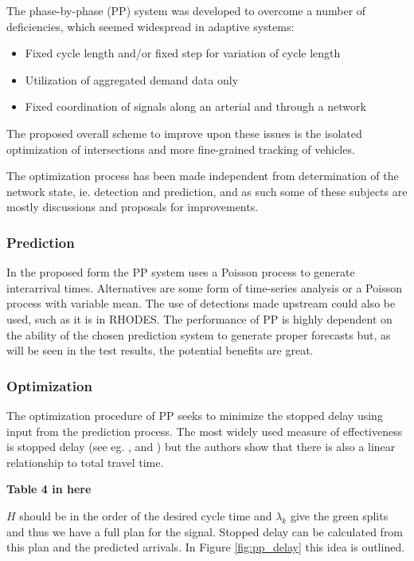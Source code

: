The phase-by-phase (PP) system was developed to overcome a number of
deficiencies, which seemed widespread in adaptive systems:

\begin{itemize}
\item Fixed cycle length and/or fixed step for variation of cycle length
\item Utilization of aggregated demand data only
\item Fixed coordination of signals along an arterial and through a network
\end{itemize}

The proposed overall scheme to improve upon these issues is the
isolated optimization of intersections and more fine-grained tracking
of vehicles.

The optimization process has been made independent from determination
of the network state, ie. detection and prediction, and as such some of
these subjects are mostly discussions and proposals for improvements.

\subsubsection*{Prediction}

In the proposed form the PP system uses a Poisson process to generate
interarrival times.  Alternatives are some form of time-series
analysis or a Poisson process with variable mean. The use of
detections made upstream could also be used, such as it is in RHODES.
The performance of PP is highly dependent on the ability of the chosen
prediction system to generate proper forecasts but, as will be seen in
the test results, the potential benefits are great.

\subsubsection*{Optimization}

The optimization procedure of PP seeks to minimize the stopped delay
using input from the prediction process. The most widely used measure
of effectiveness is stopped delay (see eg. \citet{9}, \citet{38} and
\citet{31}) but the authors show that there is also a linear
relationship to total travel time.

\begin{center}
{\bf Table 4 in here}
\end{center}

$H$ should be in the order of the desired cycle time and $\lambda_k$
give the green splits and thus we have a full plan for the
signal. Stopped delay can be calculated from this plan and the
predicted arrivals. In Figure \ref{fig:pp_delay} this idea is
outlined.

